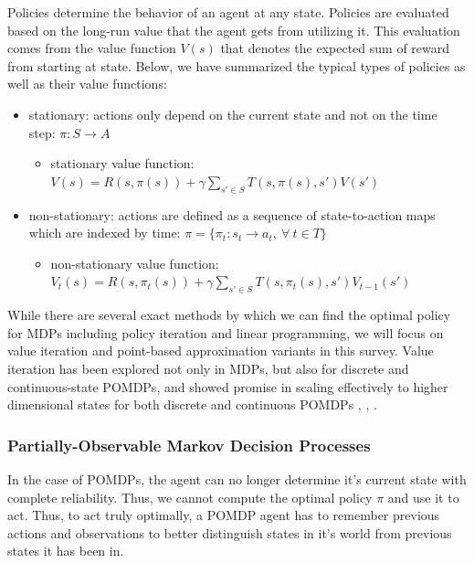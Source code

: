 \documentclass[12pt]{elsarticle}
\begin{document}
Policies determine the behavior of an agent at any state. Policies are evaluated based on the long-run value that the agent gets from utilizing it. This evaluation comes from the value function $V(s)$ that denotes the expected sum of reward from starting at state. Below, we have summarized the typical types of policies as well as their value functions:
\begin{itemize}
    \item stationary: actions only depend on the current state and not on the time step: $\pi: S \rightarrow A$
    \begin{itemize}
        \item stationary value function: 
        \\$V(s) = R(s,\pi(s)) + \gamma \sum_{s' \in S} T(s,\pi(s),s') V(s')$
    \end{itemize}
    \item non-stationary: actions are defined as a sequence of state-to-action maps which are indexed by time: $\pi = \{\pi_t: s_t \rightarrow a_t, ~\forall~t \in T\}$
    \begin{itemize}
        \item non-stationary value function: 
        \\$V_{t}(s) = R(s,\pi_t(s)) + \gamma \sum_{s' \in S} T(s,\pi_{t}(s),s') V_{t-1}(s')$
    \end{itemize}
\end{itemize}

While there are several exact methods by which we can find the optimal policy for MDPs including policy iteration and linear programming, we will focus on value iteration and point-based approximation variants in this survey. Value iteration has been explored not only in MDPs, but also for discrete and continuous-state POMDPs, and showed promise in scaling effectively to higher dimensional states for both discrete and continuous POMDPs \cite{kaelbling1998planning}, \cite{pineau2003point}, \cite{porta2006point}. 

\subsubsection{Partially-Observable Markov Decision Processes}

In the case of POMDPs, the agent can no longer determine it's current state with complete reliability. Thus, we cannot compute the optimal policy $\pi$ and use it to act. Thus, to act truly optimally, a POMDP agent has to remember previous actions and observations to better distinguish states in it's world from previous states it has been in. 
\end{document}
